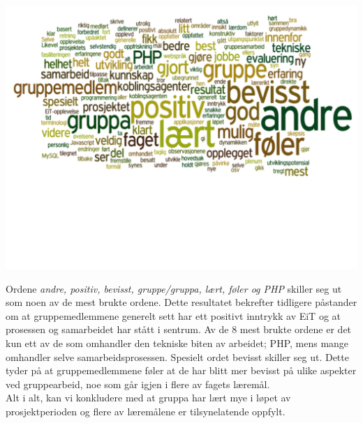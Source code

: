 \begin{center}
\includegraphics[clip=true, width=1 \textwidth,
trim=0cm 0cm 0cm 0cm]{ordsky.pdf}
\label{fig:Ordsky}
\end{center}

Ordene \textit{andre, positiv, bevisst, gruppe/gruppa, lært, føler og PHP} skiller seg ut som noen av de mest brukte ordene. Dette resultatet bekrefter tidligere påstander om at gruppemedlemmene generelt sett har ett positivt inntrykk av EiT og at prosessen og samarbeidet har stått i sentrum. Av de 8 mest brukte ordene er det kun ett av de som omhandler den tekniske biten av arbeidet; PHP, mens mange omhandler selve samarbeidsprosessen. Spesielt ordet bevisst skiller seg ut. Dette tyder på at gruppemedlemmene føler at de har blitt mer bevisst på ulike aspekter ved gruppearbeid, noe som går igjen i flere av fagets læremål.\\

Alt i alt, kan vi konkludere med at gruppa har lært mye i løpet av prosjektperioden og flere av læremålene er tilsynelatende oppfylt.\\
